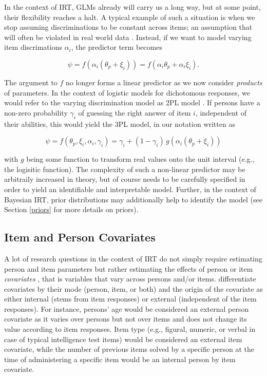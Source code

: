 \documentclass[jss]{jss}
\begin{document}
In the context of IRT, GLMs already will carry us a long way, but at
some point, their flexibility reaches a halt. A typical example of such
a situation is when we stop assuming discriminations to be constant
across items; an assumption that will often be violated in real world
data \citep{andrich2004}. Instead, if we want to model varying item
discrimations \(\alpha_i\), the predictor term becomes

\[
\psi = f(\alpha_i (\theta_p + \xi_i)) = f(\alpha_i \theta_p + \alpha_i \xi_i).
\]

The argument to \(f\) no longer forms a linear predictor as we now
consider \emph{products} of parameters. In the context of logistic
models for dichotomous responses, we would refer to the varying
discrimination model as 2PL model \citep[e.g.,][]{andrich2004}. If
persons have a non-zero probability \(\gamma_i\) of guessing the right
answer of item \(i\), independent of their abilities, this would yield
the 3PL model, in our notation written as

\[
\psi = f(\theta_{p}, \xi_{i}, \alpha_i, \gamma_i) = 
\gamma_i + (1 - \gamma_i) \, g(\alpha_i (\theta_p + \xi_i))
\]

with \(g\) being some function to transform real values onto the unit
interval (e.g., the logisitic function). The complexity of such a
non-linear predictor may be arbitraily increased in theory, but of
course needs to be carefully specified in order to yield an identifiable
and interpretable model. Further, in the context of Bayesian IRT, prior
distributions may additionally help to identify the model (see Section
\ref{priors} for more details on priors).

\hypertarget{item-and-person-covariates}{%
\subsection{Item and Person
Covariates}\label{item-and-person-covariates}}

A lot of research questions in the context of IRT do not simply require
estimating person and item parameters but rather estimating the effects
of person or item \emph{covariates} \citep{deboeck2011}, that is
variables that vary across persons and/or items. \citet{deboeck2011}
differentiate covariates by their mode (person, item, or both) and the
origin of the covariate as either internal (stems from item responses)
or external (independent of the item responses). For instance, persons'
age would be considered an external person covariate as it varies over
persons but not over items and does not change its value according to
item responses. Item type (e.g., figural, numeric, or verbal in case of
typical intelligence test items) would be considered an external item
covariate, while the number of previous items solved by a specific
person at the time of administering a specific item would be an internal
person by item covariate.
\end{document}
